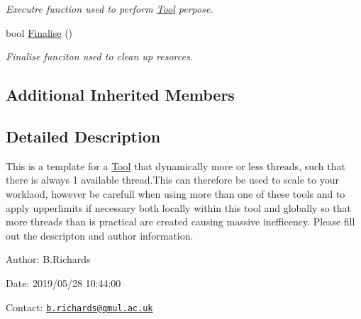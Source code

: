 \begin{DoxyCompactItemize}
\begin{DoxyCompactList}\small\item\em Executre function used to perform \hyperlink{classTool}{Tool} perpose. \end{DoxyCompactList}\item 
\hypertarget{classMyToolDynamicMultiThread_ab70e77b0fd90e50c5103ccfa0bfd6485}{bool \hyperlink{classMyToolDynamicMultiThread_ab70e77b0fd90e50c5103ccfa0bfd6485}{Finalise} ()}\label{classMyToolDynamicMultiThread_ab70e77b0fd90e50c5103ccfa0bfd6485}

\begin{DoxyCompactList}\small\item\em Finalise funciton used to clean up resorces. \end{DoxyCompactList}\end{DoxyCompactItemize}
\subsection*{Additional Inherited Members}


\subsection{Detailed Description}
This is a template for a \hyperlink{classTool}{Tool} that dynamically more or less threads, such that there is always 1 available thread.\-This can therefore be used to scale to your worklaod, however be carefull when using more than one of these tools and to apply upperlimits if necessary both locally within this tool and globally so that more threads than is practical are created causing massive inefficency. Please fill out the descripton and author information.

\begin{DoxyParagraph}{Author\-:}
B.\-Richards 
\end{DoxyParagraph}
\begin{DoxyParagraph}{Date\-:}
2019/05/28 10\-:44\-:00 
\end{DoxyParagraph}
Contact\-: \href{mailto:b.richards@qmul.ac.uk}{\tt b.\-richards@qmul.\-ac.\-uk} 

